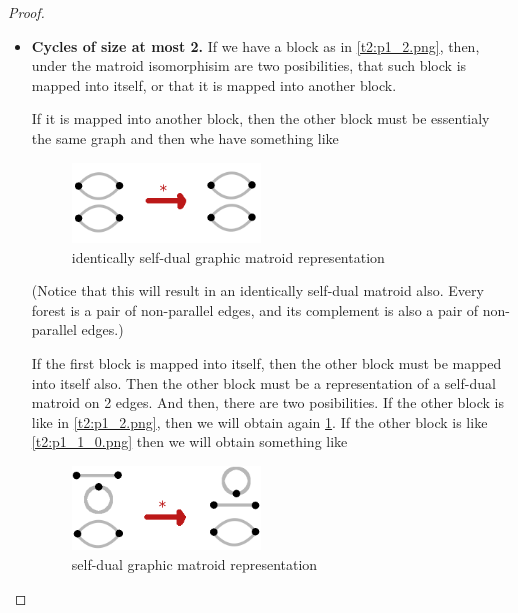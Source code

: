 \begin{proof}
\begin{enumerate}[label=(\roman*)]
\begin{itemize}
                   \item \textbf{Cycles of size at most 2.}
                        If we have a block as in \ref{t2:p1_2.png}, then, under the matroid isomorphisim are two posibilities,
                        that such block is mapped into itself, or that it is mapped into another block.
                        
                        If it is mapped into another block, then the other block must be essentialy the same graph and then
                        whe have something like
                        \begin{figure}[H]
                            \begin{center}
                            \includegraphics[width=5cm]{Test2/Problem1/2-2.png}
                            \end{center}                            
                            \caption{identically self-dual graphic matroid representation}
                            \label{t2:p1_2-2.png}                        
                        \end{figure}\pn
                        
                        (Notice that this will result in an identically self-dual matroid also. Every forest is a pair of
                        non-parallel edges, and its complement is also a pair of non-parallel edges.)\pn
                        
                        If the first block is mapped into itself, then the other block must be mapped into itself also.
                        Then the other block must be a representation of a self-dual matroid on 2 edges. And then, there are
                        two posibilities. If the other block is like in \ref{t2:p1_2.png}, then we will obtain again 
                        \ref{t2:p1_2-2.png}. If the other block is like \ref{t2:p1_1_0.png} then we will obtain something like
                        \begin{figure}[H]
                            \begin{center}
                            \includegraphics[width=5cm]{Test2/Problem1/2-1_0.png}
                            \end{center}                            
                            \caption{self-dual graphic matroid representation}
                            \label{t2:p1_2-1_0.png}                        
                        \end{figure}\pn
                        

\end{itemize}
\end{enumerate}
\end{proof}
